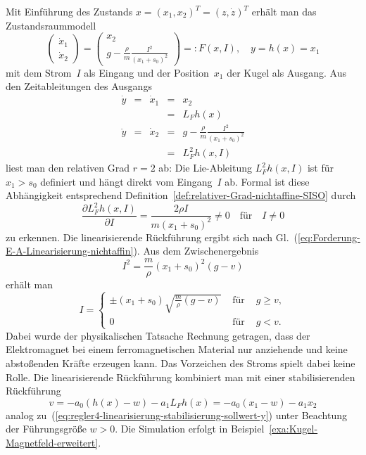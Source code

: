 \begin{example}
Mit Einführung des Zustands $x=(x_{1},x_{2})^{T}=(z,\dot{z})^{T}$
erhält man das Zustandsraummodell 
\begin{equation}
\left(\begin{array}{l}
\dot{x}_{1}\\
\dot{x}_{2}
\end{array}\right)=\left(\begin{array}{c}
x_{2}\\
g-\frac{\rho}{m}\frac{I^{2}}{(x_{1}+s_{0})^{2}}
\end{array}\right)=:F(x,I),\quad y=h(x)=x_{1}\label{eq:kugel-magnet-zustandsmodell}
\end{equation}
mit dem Strom~$I$ als Eingang und der Position~$x_{1}$ der Kugel
als Ausgang. Aus den Zeitableitungen des Ausgangs 
\[
\begin{array}{cclcl}
\dot{y} & = & \dot{x}_{1} & = & x_{2}\\
 &  &  & = & L_{F}h(x)\\
\ddot{y} & = & \dot{x}_{2} & = & g-\frac{\rho}{m}\frac{I^{2}}{(x_{1}+s_{0})^{2}}\\
 &  &  & = & L_{F}^{2}h(x,I)
\end{array}
\]
liest man den relativen Grad $r=2$ ab: Die Lie-Ableitung $L_{F}^{2}h(x,I)$
ist für $x_{1}>s_{0}$ definiert und hängt direkt vom Eingang~$I$
ab. Formal ist diese Abhängigkeit entsprechend Definition~\ref{def:relativer-Grad-nichtaffine-SISO}
durch 
\[
\frac{\partial L_{F}^{2}h(x,I)}{\partial I}=\frac{2\rho I}{m(x_{1}+s_{0})^{2}}\neq0\quad\text{für}\quad I\neq0
\]
zu erkennen. Die linearisierende Rückführung ergibt sich nach Gl.~(\ref{eq:Forderung-E-A-Linearisierung-nichtaffin}).
Aus dem Zwischenergebnis 
\[
I^{2}=\frac{m}{\rho}(x_{1}+s_{0})^{2}(g-v)
\]
erhält man 
\begin{equation}
I=\left\{ \begin{array}{lcl}
\pm(x_{1}+s_{0})\sqrt{\frac{m}{\rho}(g-v)} & \text{ für } & g\geq v,\\
0 & \text{ für } & g<v.
\end{array}\right.\label{eq:Kugel-linearisierende-rueckfuehrung}
\end{equation}
Dabei wurde der physikalischen Tatsache Rechnung getragen, dass der
Elektromagnet bei einem ferromagnetischen Material nur anziehende
und keine abstoßenden Kräfte erzeugen kann. Das Vorzeichen des Stroms
spielt dabei keine Rolle. Die linearisierende Rückführung kombiniert
man mit einer stabilisierenden Rückführung 
\begin{equation}
v=-a_{0}(h(x)-w)-a_{1}L_{F}h(x)=-a_{0}(x_{1}-w)-a_{1}x_{2}\label{eq:Kugel-stabilisierende-rueckfuehrung}
\end{equation}
analog zu~(\ref{eq:regler4-linearisierung-stabilisierung-sollwert-y})
unter Beachtung der Führungsgröße $w>0$. Die Simulation erfolgt in
Beispiel~\ref{exa:Kugel-Magnetfeld-erweitert}.

\end{example}

